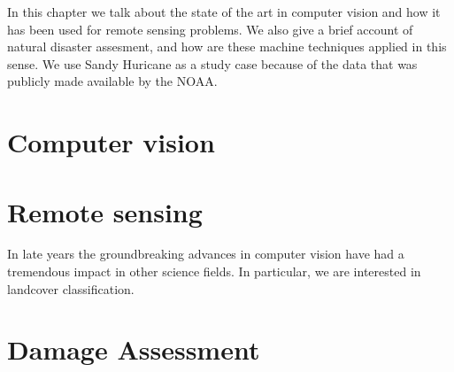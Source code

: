 In this chapter we talk about the state of the art in computer vision and how it has been used for remote sensing problems. We also give a brief account of natural disaster assesment, and how are these machine techniques applied in this sense. We use Sandy Huricane as a study case because of the data that was publicly made available by the NOAA.

\section{Computer vision}



\section{Remote sensing}

In late years the groundbreaking advances in computer vision have had a tremendous impact in other science fields. In particular, we are interested in landcover classification.

\section{Damage Assessment}
